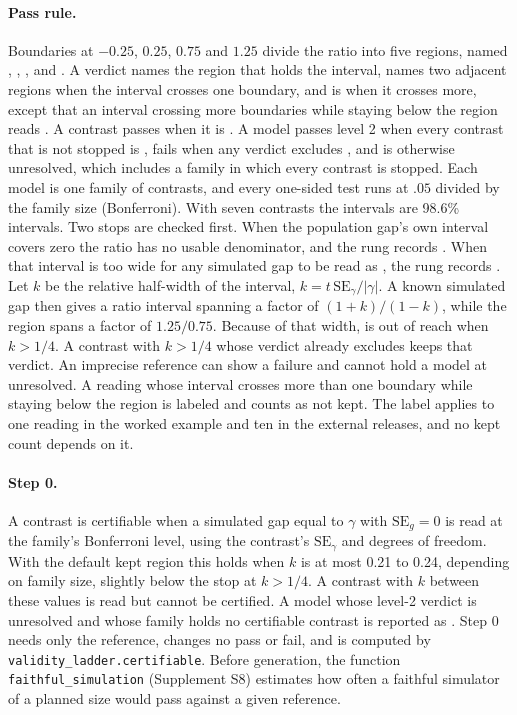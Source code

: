 \paragraph{Pass rule.}
Boundaries at $-0.25$, $0.25$, $0.75$ and $1.25$ divide the ratio into five regions, named , , ,  and .
A verdict names the region that holds the interval, names two adjacent regions when the interval crosses one boundary, and is  when it crosses more, except that an interval crossing more boundaries while staying below the  region reads .
A contrast passes when it is .
A model passes level 2 when every contrast that is not stopped is , fails when any verdict excludes , and is otherwise unresolved, which includes a family in which every contrast is stopped.
Each model is one family of contrasts, and every one-sided test runs at $.05$ divided by the family size (Bonferroni).
With seven contrasts the intervals are 98.6\% intervals.
Two stops are checked first.
When the population gap's own interval covers zero the ratio has no usable denominator, and the rung records .
When that interval is too wide for any simulated gap to be read as , the rung records .
Let $k$ be the relative half-width of the interval, $k = t\,\mathrm{SE}_\gamma / |\gamma|$.
A known simulated gap then gives a ratio interval spanning a factor of $(1+k)/(1-k)$, while the  region spans a factor of $1.25/0.75$.
Because of that width,  is out of reach when $k > 1/4$.
A contrast with $k > 1/4$ whose verdict already excludes  keeps that verdict.
An imprecise reference can show a failure and cannot hold a model at unresolved.
A reading whose interval crosses more than one boundary while staying below the  region is labeled  and counts as not kept.
The label applies to one reading in the worked example and ten in the external releases, and no kept count depends on it. %

\paragraph{Step 0.}
A contrast is certifiable when a simulated gap equal to $\gamma$ with $\mathrm{SE}_g = 0$ is read  at the family's Bonferroni level, using the contrast's $\mathrm{SE}_\gamma$ and degrees of freedom.
With the default kept region this holds when $k$ is at most 0.21 to 0.24, depending on family size, slightly below the stop at $k > 1/4$.
A contrast with $k$ between these values is read but cannot be certified.
A model whose level-2 verdict is unresolved and whose family holds no certifiable contrast is reported as .
Step 0 needs only the reference, changes no pass or fail, and is computed by \texttt{validity\_ladder.certifiable}.
Before generation, the function \texttt{faithful\_simulation} (Supplement S8) estimates how often a faithful simulator of a planned size would pass against a given reference.

